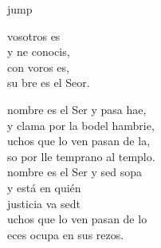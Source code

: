 \begin{cancion}jump\\
	\begin{chorus}%
		 vosotros es \\
		y ne conocis,\\
		con voros es, \\
		su bre es el Seor.\jump\\
	\end{chorus}%
	nombre es el Ser y pasa hae,\\
	y clama por la bodel hambrie,\\
	uchos que lo ven pasan de la,\\
	so por lle temprano al templo.\\
	\jump
	nombre es el Ser y sed sopa\\
	\jump
y está en quién \\
	justicia va sedt\\
	uchos que lo ven pasan de lo\\
	eces ocupa en sus rezos.\\
	\jump
\end{cancion}%
